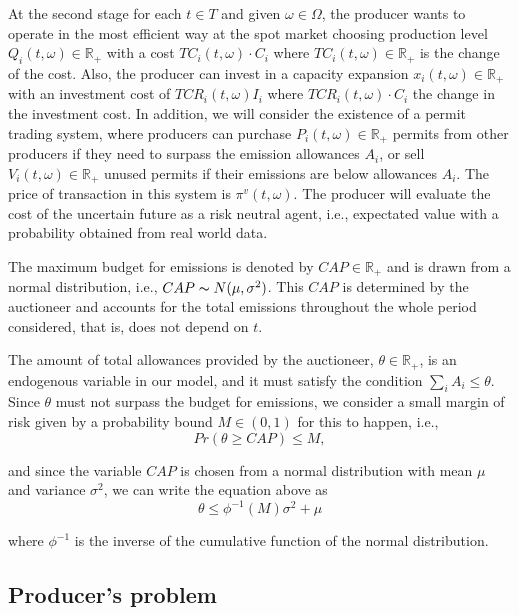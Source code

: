 \documentclass[11pt, letterpaper]{article}
\begin{document}
At the second stage for each $t\in T$ and given $\omega\in \Omega$, the producer wants to operate in the most efficient way at the spot market choosing production level $Q_i(t,\omega)\in\mathbb{R}_+$ with a cost  $TC_i(t,\omega)\cdot C_i$ where $TC_i(t,\omega)\in\mathbb{R}_+$ is the change of the cost. Also, the producer can invest in a capacity expansion $x_i(t,\omega)\in\mathbb{R}_+$ with an investment cost of $TCR_i(t,\omega)I_i$  where $TCR_i(t,\omega)\cdot C_i$ the change in the investment cost. In addition,  we will consider the existence of a permit trading system, where producers can purchase $P_i(t,\omega)\in\mathbb{R}_+$ permits from other producers if they need to surpass the emission allowances $A_i$, or sell $V_i(t,\omega)\in\mathbb{R}_+$ unused permits if their emissions are below allowances $A_i$. The price of transaction in this system is $\pi^v(t,\omega)$. The producer will evaluate the cost of the uncertain future as a risk neutral agent, i.e., expectated value with a probability obtained from real world data.
\smallskip


The maximum budget for emissions is denoted by  $CAP\in\mathbb{R}_+$ and is drawn from a normal distribution, i.e., $CAP \thicksim N(\mu, \sigma^2)$. This $CAP$ is determined by the auctioneer and  accounts for the total emissions throughout the whole period considered, that is, does not depend on $t$. 


\smallskip
The amount of total allowances provided by the auctioneer, $\theta\in\mathbb{R}_+$, is an endogenous variable in our model, and it must satisfy the condition $\sum_i A_i \leq \theta$. 
Since $\theta$ must not surpass the budget for emissions, we consider a small margin of risk given by a probability bound $M\in(0,1)$ for this to happen, i.e.,
\begin{equation}
    Pr(\theta \geq CAP) \leq M,
\end{equation}

and since the variable $CAP$ is chosen from a normal distribution with mean $\mu$ and variance $\sigma^2$, we can write the equation above as
\begin{equation}
    \theta \leq \phi^{-1}(M) \sigma^2 + \mu
\end{equation}

where $\phi^{-1}$ is the inverse of the cumulative function of the normal distribution. 


\hspace{0.5cm}




\subsection{Producer's problem}
\end{document}
